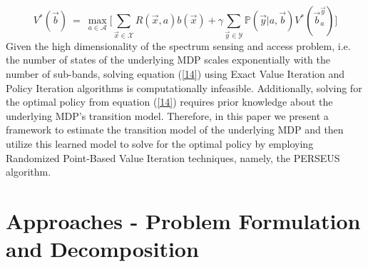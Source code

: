 \documentclass[12pt, draftcls, onecolumn]{IEEEtran}
\begin{document}
\begin{equation}\label{14}
    V^*(\vec{b})\ =\ \max_{a \in \mathcal{A}}\Big[\sum_{\vec{x} \in \mathcal{X}}R(\vec{x},a)b(\vec{x}) + \gamma \sum_{\vec{y} \in \mathcal{Y}}\mathbb{P}(\vec{y}|a,\vec{b})V^*(\vec{b}_a^{\vec{y}})\Big]
\end{equation}
Given the high dimensionality of the spectrum sensing and access problem, i.e. the number of states of the underlying MDP scales exponentially with the number of sub-bands, solving equation (\ref{14}) using Exact Value Iteration and Policy Iteration algorithms is computationally infeasible. Additionally, solving for the optimal policy from equation (\ref{14}) requires prior knowledge about the underlying MDP's transition model. Therefore, in this paper we present a framework to estimate the transition model of the underlying MDP and then utilize this learned model to solve for the optimal policy by employing Randomized Point-Based Value Iteration techniques, namely, the PERSEUS algorithm.
\clearpage
\section{Approaches - Problem Formulation and Decomposition}
\end{document}
